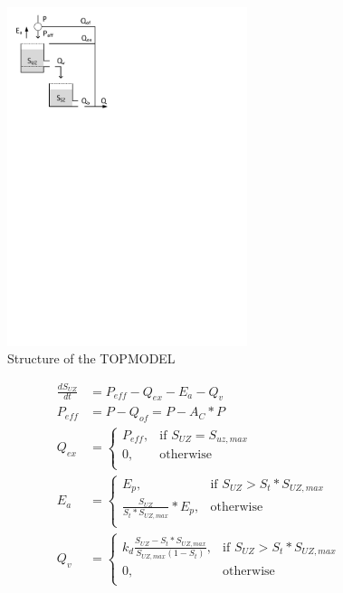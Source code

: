{ 																	%
\begin{figure}
\includegraphics[trim=1cm 21cm 7cm 1cm,width=7cm,keepaspectratio]{./AppA_files/14_schematic.pdf}
\caption{Structure of the TOPMODEL} \label{fig:14_schematic}
\end{figure}

\begin{align}
	\frac{dS_{UZ}}{dt} &= P_{eff} - Q_{ex} - E_a - Q_v \\
	P_{eff} &= P - Q_{of} = P - A_C*P\\
	Q_{ex} &= \begin{cases}
		P_{eff}, & \text{if } S_{UZ} = S_{uz,max} \\
		0, & \text{otherwise}\\
	\end{cases}\\
	E_a &= 
	\begin{cases}
		E_p, & \text{if } S_{UZ} > S_t*S_{UZ,max} \\
		\frac{S_{UZ}}{S_t*S_{UZ,max}}*E_p, & \text{otherwise}\\
	\end{cases}\\	
	Q_v &=  
		\begin{cases}
		k_d\frac{S_{UZ} - S_t*S_{UZ,max}}{S_{UZ,max}(1-S_t)}, & \text{if } S_{UZ} > S_t*S_{UZ,max} \\
		0, & \text{otherwise}\\
	\end{cases}
\end{align}

} %
\vspace{0.5cm}


